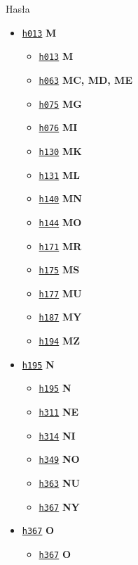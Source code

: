 \documentclass[12]{mwart}
\begin{document}
Hasła

\begin{itemize}
\item \href{\paiii{3}{14}}{\texttt{h013}} \textbf{M}
  \begin{itemize}
  \item \href{\paiii{3}{15}}{\texttt{h013}} \textbf{M}
  \item \href{\paiii{3}{65}}{\texttt{h063}} \textbf{MC, MD, ME}
  \item \href{\paiii{3}{77}}{\texttt{h075}} \textbf{MG}
  \item \href{\paiii{3}{78}}{\texttt{h076}} \textbf{MI}
  \item \href{\paiii{3}{132}}{\texttt{h130}} \textbf{MK}
  \item \href{\paiii{3}{133}}{\texttt{h131}} \textbf{ML}
  \item \href{\paiii{3}{142}}{\texttt{h140}} \textbf{MN}
  \item \href{\paiii{3}{146}}{\texttt{h144}} \textbf{MO}
  \item \href{\paiii{3}{173}}{\texttt{h171}} \textbf{MR}
  \item \href{\paiii{3}{177}}{\texttt{h175}} \textbf{MS}
  \item \href{\paiii{3}{179}}{\texttt{h177}} \textbf{MU}
  \item \href{\paiii{3}{189}}{\texttt{h187}} \textbf{MY}
  \item \href{\paiii{3}{196}}{\texttt{h194}} \textbf{MZ}
  \end{itemize}
\item \href{\paiii{3}{197}}{\texttt{h195}} \textbf{N}
  \begin{itemize}
  \item \href{\paiii{3}{197}}{\texttt{h195}} \textbf{N}
  \item \href{\paiii{3}{313}}{\texttt{h311}} \textbf{NE}
  \item \href{\paiii{3}{316}}{\texttt{h314}} \textbf{NI}
  \item \href{\paiii{3}{351}}{\texttt{h349}} \textbf{NO}
  \item \href{\paiii{3}{365}}{\texttt{h363}} \textbf{NU}
  \item \href{\paiii{3}{369}}{\texttt{h367}} \textbf{NY}
  \end{itemize}
\item \href{\paiii{3}{369}}{\texttt{h367}} \textbf{O}
    \begin{itemize}
    \item \href{\paiii{3}{369}}{\texttt{h367}} \textbf{O}

\end{itemize}
\end{itemize}
\end{document}
